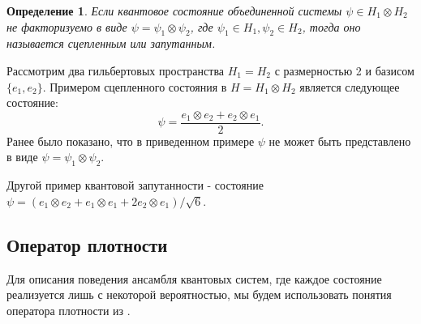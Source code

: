 \documentclass[11pt]{article}
\newtheorem{definition}{Определение}[section]
\begin{document}
\begin{definition}
Если квантовое состояние объединенной системы $\psi\in H_1\otimes H_2$ не факторизуемо в виде  $\psi = \psi_1\otimes\psi_2$, где $\psi_1\in H_1, \psi_2\in H_2$, тогда оно называется сцепленным или запутанным. 
\end{definition}  
Рассмотрим два гильбертовых пространства $H_1 = H_2$ с размерностью 2 и базисом $\{e_1, e_2\}$. Примером сцепленного состояния в $H = H_1 \otimes H_2$ является следующее состояние: 
\[
\psi = \frac{e_1\otimes e_2 + e_2\otimes e_1}{2}.
\]
Ранее было показано, что в приведенном примере $\psi$ не может быть представлено в виде $\psi = \psi_1\otimes\psi_2$.

Другой пример квантовой запутанности - состояние $\psi = (e_1\otimes e_2 + e_1 \otimes e_1 + 2e_2 \otimes e_1) / \sqrt{6}$.


\subsection{Оператор плотности}

Для описания поведения ансамбля квантовых систем, где каждое состояние реализуется лишь с некоторой вероятностью, мы будем использовать понятия оператора плотности из \cite{Khrennikov_information}.
\end{document}
